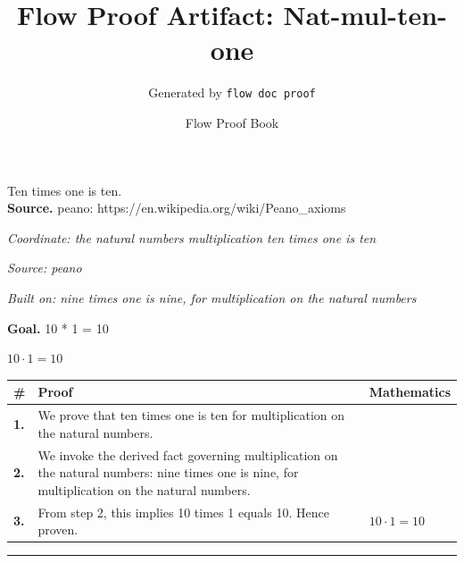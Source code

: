 \documentclass[11pt]{article}
\title{Flow Proof Artifact: Nat-mul-ten-one}
\author{Generated by \texttt{flow doc proof}}
\date{Flow Proof Book}
\theoremstyle{definition}
\begin{document}
\maketitle
Ten times one is ten.\\[0.5em]
\textbf{Source.} peano: https://en.wikipedia.org/wiki/Peano\_axioms\\[0.5em]
\bigskip
{}\par
\smallskip\noindent\textit{Coordinate: the natural numbers \cdot multiplication \cdot ten times one is ten}\par
\smallskip\noindent\textit{Source: peano}\par
\smallskip\noindent\textit{Built on: nine times one is nine, for multiplication on the natural numbers}\par
\medskip
\noindent\textbf{Goal.} 10 * 1 = 10\par
\noindent$\displaystyle 10 \cdot 1 = 10$\par
\medskip
\noindent
\begin{tabular}{@{} >{\raggedright\arraybackslash}p{} >{\raggedright\arraybackslash}p{} >{\raggedleft\arraybackslash}p{} @{}}
\textbf{\#} & \textbf{Proof} & \textbf{Mathematics} \\
\midrule
\textbf{1.} & We prove that ten times one is ten for multiplication on the natural numbers. & \\[0.45em]
\textbf{2.} & We invoke the derived fact governing multiplication on the natural numbers: nine times one is nine, for multiplication on the natural numbers. & \\[0.45em]
\textbf{3.} & From step 2, this implies 10 times 1 equals 10. Hence proven. & $\displaystyle 10 \cdot 1 = 10$ \\[0.45em]
\bottomrule
\end{tabular}
\label{thm:Nat-multiplication-ten_times_one_is_ten}
\par\medskip\hrule
\end{document}

